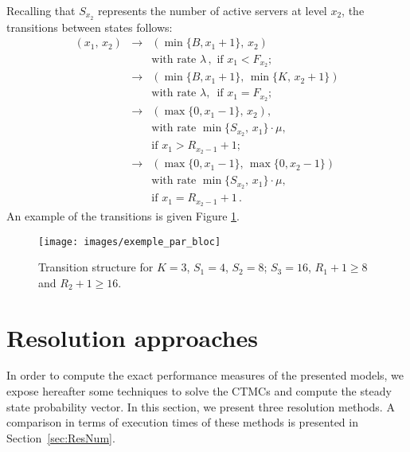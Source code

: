 \documentclass[conference]{IEEEtran}
\begin{document}
Recalling that   $S_{x_2}$ represents the number of active servers at level $x_2$, the transitions between states follows:
\begin{equation*}
\begin{array}{rcl}
\! \! (x_{1},\,x_{2})\! & \! \rightarrow & (\min\{B,x_{1}+1\},\,x_{2}) \\
                & & \! \text{with rate } \lambda \, , \text{ if } x_{1} < F_{x_2} ;\\
                & \! \rightarrow & (\min\{B,x_{1}+1\},\,\min\{K,\,x_{2}+1\}) \\
                & & \! \text{with rate } \lambda , \, \text{ if } x_{1}=F_{x_2} ; \\   
                & \! \rightarrow &  (\max\{0,x_{1}-1\},\,x_{2}) , \\              
                & & \! \text{with rate }  \min\{S_{x_{2}},\,x_{1}\} \cdot \mu,    \\          
                & & \! \text{if } x_{1} \! > R_{x_2-1} \!+\! 1  ; \\
                & \! \rightarrow & (\max\{0,x_{1}-1\},\,\max\{0,x_{2}-1\}) \\               
                & & \! \text{with rate }   \min\{S_{x_{2}},\,x_{1}\} \cdot \mu,    \\             
                & & \! \text{if }   x_{1}=R_{x_2-1}+1  \, .       
\end{array}
\end{equation*}
An example of the transitions is given Figure \ref{fig:image-chap4-exemple_par_bloc}.

\begin{figure}[hbtp]
\centering
\texttt{[image: images/exemple\_par\_bloc]}
\caption{Transition structure for $K=3$, $S_1=4$, $S_2=8$; $S_3=16$, $R_1+1 \geq 8$ and $R_2+1 \geq 16$.}
  \label{fig:image-chap4-exemple_par_bloc}
\end{figure}



\section{Resolution approaches} %
\label{sec:ResModel}
In order to compute the exact performance measures of the presented models, we  expose hereafter some techniques to solve the CTMCs and compute the steady state probability vector. In this section, we present three resolution methods. A comparison in terms of execution times of these methods is presented in Section~\ref{sec:ResNum}.
\end{document}

